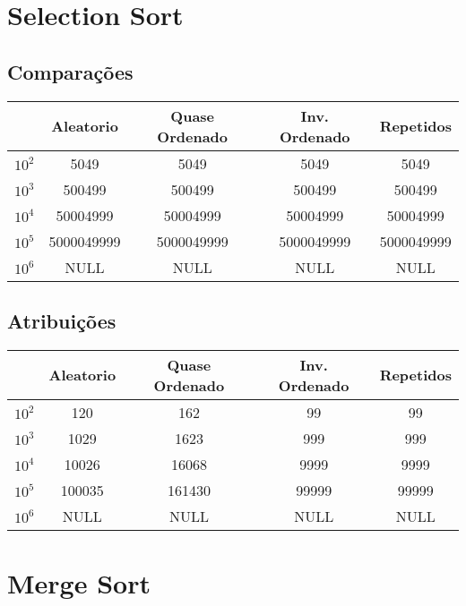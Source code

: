 \section{Selection Sort}
\label{sec:selection_sort}
\subsection{Comparações}
\begin{tabular}{|c|c|c|c|c|}
\hline
  & Aleatorio  & Quase Ordenado & Inv. Ordenado & Repetidos  \\
  \hline
$10^2$ & 5049       & 5049           & 5049          & 5049       \\
\hline
$10^3$ & 500499     & 500499         & 500499        & 500499     \\
\hline
$10^4$ & 50004999   & 50004999       & 50004999      & 50004999   \\
\hline
$10^5$ & 5000049999 & 5000049999     & 5000049999    & 5000049999 \\
\hline
$10^6$ & NULL       & NULL           & NULL          & NULL      \\
\hline
\end{tabular}
\subsection{Atribuições}
\begin{tabular}{|c|c|c|c|c|}
\hline
  & Aleatorio & Quase Ordenado & Inv. Ordenado & Repetidos \\
  \hline
$10^2$ & 120       & 162            & 99            & 99        \\
\hline
$10^3$ & 1029      & 1623           & 999           & 999       \\
\hline
$10^4$ & 10026     & 16068          & 9999          & 9999      \\
\hline
$10^5$ & 100035    & 161430         & 99999         & 99999     \\
\hline
$10^6$ & NULL      & NULL           & NULL          & NULL     \\
\hline
\end{tabular}

\section{Merge Sort}
\label{sec:merge_sort}
